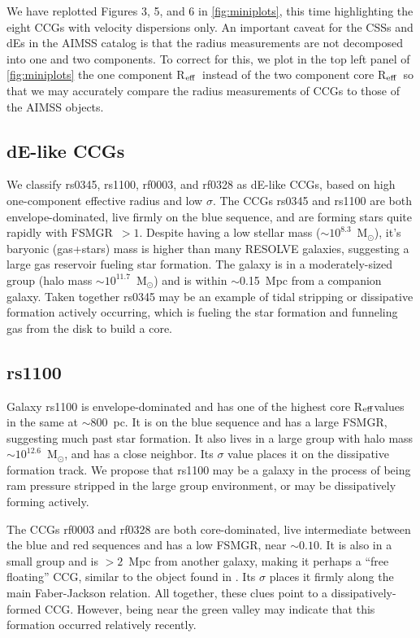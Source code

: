 \documentclass[iop,apj]{emulateapj}
\newcommand{\Reff}{R$_{\rm eff}$}
\newcommand{\Msun}{M$_{\odot}$}
\begin{document}
We have replotted Figures 3, 5, and 6 in \autoref{fig:miniplots}, this time highlighting the eight CCGs with velocity dispersions only. An important caveat for the CSSs and dEs in the AIMSS catalog is that the radius measurements are not decomposed into one and two components. To correct for this, we plot in the top left panel of \autoref{fig:miniplots} the one component \Reff\ instead of the two component core \Reff\ so that we may accurately compare the radius measurements of CCGs to those of the AIMSS objects.

\subsection{dE-like CCGs}
We classify rs0345, rs1100, rf0003, and rf0328 as dE-like CCGs, based on high one-component effective radius and low $\sigma$. The CCGs rs0345 and rs1100 are both envelope-dominated, live firmly on the blue sequence, and are forming stars quite rapidly with FSMGR~$>1$. Despite having a low stellar mass ($\sim10^{ 8.3}$~\Msun), it's baryonic (gas+stars) mass is higher than many RESOLVE galaxies, suggesting a large gas reservoir fueling star formation. The galaxy is in a moderately-sized group (halo mass $\sim10^{11.7}$~\Msun) and is within $\sim$0.15~Mpc from a companion galaxy. Taken together rs0345 may be an example of tidal stripping or dissipative formation actively occurring, which is fueling the star formation and funneling gas from the disk to build a core.

\subsection{rs1100}
Galaxy rs1100 is envelope-dominated and has one of the highest core \Reff values in the same at $\sim 800$~pc. It is on the blue sequence and has a large FSMGR, suggesting much past star formation. It also lives in a large group with halo mass $\sim10^{12.6}$~\Msun, and has a close neighbor. Its $\sigma$ value places it on the dissipative formation track. We propose that rs1100 may be a galaxy in the process of being ram pressure stripped in the large group environment, or may be dissipatively forming actively.

The CCGs rf0003 and rf0328 are both core-dominated, live intermediate between the blue and red sequences and has a low FSMGR, near $\sim0.10$. It is also in a small group and is $>2$~Mpc from another galaxy, making it perhaps a ``free floating'' CCG, similar to the object found in \citet{Huxor2013}. Its $\sigma$ places it firmly along the main Faber-Jackson relation. All together, these clues point to a dissipatively-formed CCG. However, being near the green valley may indicate that this formation occurred relatively recently.
\end{document}
